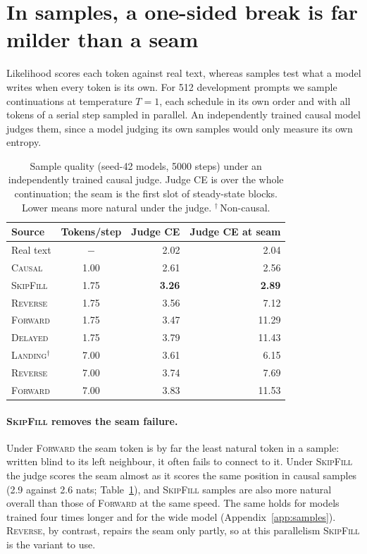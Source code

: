 \documentclass{article}
\theoremstyle{definition}
\theoremstyle{remark}
\newcommand{\name}[1]{\textup{\textsc{#1}}}
\newcommand{\sfill}{\name{SkipFill}\xspace}
\newcommand{\rev}{\name{Reverse}\xspace}
\newcommand{\fwd}{\name{Forward}\xspace}
\newcommand{\causal}{\name{Causal}\xspace}
\newcommand{\delayed}{\name{Delayed}\xspace}
\newcommand{\landing}{\name{Landing}\xspace}
\begin{document}
\section{In samples, a one-sided break is far milder than a seam}
\label{sec:samples}

Likelihood scores each token against real text, whereas samples test what a model writes when every token is its own.
For 512 development prompts we sample continuations at temperature $T=1$, each schedule in its own order and with all tokens of a serial step sampled in parallel.
An independently trained causal model judges them, since a model judging its own samples would only measure its own entropy.

\begin{table}[t]
  \centering
  \caption{Sample quality (seed-42 models, 5000 steps) under an independently trained causal judge. Judge CE is over the whole continuation; the seam is the first slot of steady-state blocks. Lower means more natural under the judge. $^\dagger$\,Non-causal.}
  \label{tab:samples}
  \small
  \begin{tabular}{lcrr}
    \toprule
    Source & Tokens/step & Judge CE & Judge CE at seam \\
    \midrule
    Real text            & $-$  & 2.02 & 2.04 \\
    \causal              & 1.00 & 2.61 & 2.56 \\
    \midrule
    \sfill               & 1.75 & \textbf{3.26} & \textbf{2.89} \\
    \rev                 & 1.75 & 3.56 & 7.12 \\
    \fwd                 & 1.75 & 3.47 & 11.29 \\
    \delayed             & 1.75 & 3.79 & 11.43 \\
    \midrule
    \landing$^\dagger$   & 7.00 & 3.61 & 6.15 \\
    \rev                 & 7.00 & 3.74 & 7.69 \\
    \fwd                 & 7.00 & 3.83 & 11.53 \\
    \bottomrule
  \end{tabular}
\end{table}

\paragraph{\sfill removes the seam failure.}
Under \fwd the seam token is by far the least natural token in a sample: written blind to its left neighbour, it often fails to connect to it.
Under \sfill the judge scores the seam almost as it scores the same position in causal samples (2.9 against 2.6 nats; Table~\ref{tab:samples}), and \sfill samples are also more natural overall than those of \fwd at the same speed.
The same holds for models trained four times longer and for the wide model (Appendix~\ref{app:samples}).
\rev, by contrast, repairs the seam only partly, so at this parallelism \sfill is the variant to use.
\end{document}
